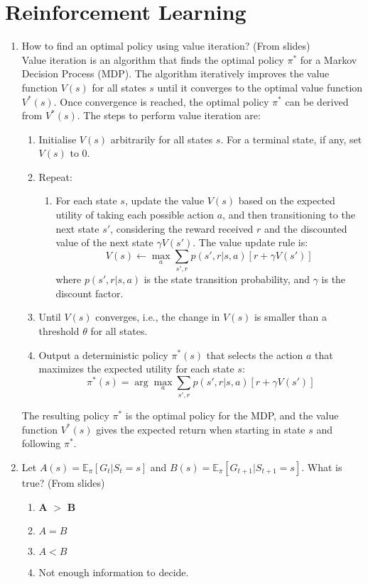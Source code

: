 \documentclass{report}
\numberwithin{equation}{section}
\begin{document}
\section{Reinforcement Learning}
\begin{enumerate}
    \item How to find an optimal policy using value iteration? (From slides)\\
        Value iteration is an algorithm that finds the optimal policy $\pi^*$ for a Markov Decision Process (MDP). The algorithm iteratively improves the value function $V(s)$ for all states $s$ until it converges to the optimal value function $V^*(s)$. Once convergence is reached, the optimal policy $\pi^*$ can be derived from $V^*(s)$. The steps to perform value iteration are:

        \begin{enumerate}
        \item Initialise $V(s)$ arbitrarily for all states $s$. For a terminal state, if any, set $V(s)$ to 0.
        \item Repeat:
        \begin{enumerate}
            \item For each state $s$, update the value $V(s)$ based on the expected utility of taking each possible action $a$, and then transitioning to the next state $s'$, considering the reward received $r$ and the discounted value of the next state $\gamma V(s')$. The value update rule is:
            \[ V(s) \leftarrow \max_a \sum_{s', r} p(s', r | s, a) [r + \gamma V(s')] \]
            where $p(s', r | s, a)$ is the state transition probability, and $\gamma$ is the discount factor.
        \end{enumerate}
        \item Until $V(s)$ converges, i.e., the change in $V(s)$ is smaller than a threshold $\theta$ for all states.
        \item Output a deterministic policy $\pi^*(s)$ that selects the action $a$ that maximizes the expected utility for each state $s$:
        \[ \pi^*(s) = \arg\max_a \sum_{s', r} p(s', r | s, a) [r + \gamma V(s')] \]
        \end{enumerate}

        The resulting policy $\pi^*$ is the optimal policy for the MDP, and the value function $V^*(s)$ gives the expected return when starting in state $s$ and following $\pi^*$.
        
    \item Let \(A(s) = \mathbb{E}_{\pi}[G_t | S_t = s]\) and \(B(s) = \mathbb{E}_{\pi}[G_{t+1} | S_{t+1} = s]\). What is true? (From slides)
    \begin{enumerate}[label=\alph*.]
    \item \textbf{A} $\mathbf{>}$ \textbf{B}
    \item \(A = B\)
    \item \(A < B\)
    \item Not enough information to decide. \newline


\end{enumerate}
\end{enumerate}
\end{document}

